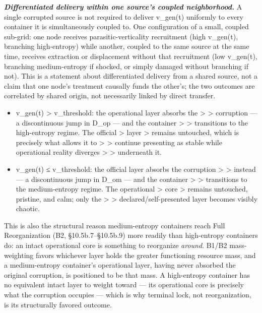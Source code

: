 \documentclass[
]{article}
\begin{document}
\emph{\textbf{Differentiated delivery within one source's coupled
neighborhood.}} A single corrupted source is not required to deliver
v\_gen(t) uniformly to every container it is simultaneously coupled to.
One configuration of a small, coupled sub-grid: one node receives
parasitic-verticality recruitment (high v\_gen(t), branching
high-entropy) while another, coupled to the same source at the same
time, receives extraction or displacement without that recruitment (low
v\_gen(t), branching medium-entropy if shocked, or simply damaged
without branching if not). This is a statement about differentiated
delivery from a shared source, not a claim that one node's treatment
causally funds the other's; the two outcomes are correlated by shared
origin, not necessarily linked by direct transfer.

\begin{itemize}
\item
  v\_gen(t) \textgreater{} v\_threshold: the operational layer absorbs
  the \textgreater{} \textgreater{} corruption --- a discontinuous jump
  in D\_op --- and the container \textgreater{} \textgreater{}
  transitions to the high-entropy regime. The official \textgreater{}
  layer \textgreater{} remains untouched, which is precisely what allows
  it to \textgreater{} \textgreater{} continue presenting as stable
  while operational reality diverges \textgreater{} \textgreater{}
  underneath it.
\item
  v\_gen(t) ≤ v\_threshold: the official layer absorbs the corruption
  \textgreater{} \textgreater{} instead --- a discontinuous jump in
  D\_om --- and the container \textgreater{} \textgreater{} transitions
  to the medium-entropy regime. The operational \textgreater{} core
  \textgreater{} remains untouched, pristine, and calm; only the
  \textgreater{} \textgreater{} declared/self-presented layer becomes
  visibly chaotic.
\end{itemize}

This is also the structural reason medium-entropy containers reach Full
Reorganization (B2, §10.5b.7--§10.5b.9) more readily than high-entropy
containers do: an intact operational core is something to reorganize
\emph{around}. B1/B2 mass-weighting favors whichever layer holds the
greater functioning resource mass, and a medium-entropy container's
operational layer, having never absorbed the original corruption, is
positioned to be that mass. A high-entropy container has no equivalent
intact layer to weight toward --- its operational core is precisely what
the corruption occupies --- which is why terminal lock, not
reorganization, is its structurally favored outcome.
\end{document}

